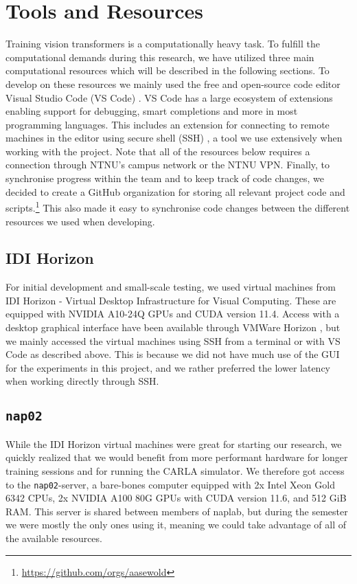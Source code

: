 \section{Tools and Resources}

Training vision transformers is a computationally heavy task.
To fulfill the computational demands during this research,
we have utilized three main computational resources which will be described in the following sections. To develop on these resources we mainly used the free and open-source code editor Visual Studio Code (VS Code) \cite{vs-code}. VS Code has a large ecosystem of extensions enabling support for debugging, smart completions and more in most programming languages. This includes an extension for connecting to remote machines in the editor using secure shell (SSH) \cite{vs-code-ssh}, a tool we use extensively when working with the project. Note that all of the resources below requires a connection through NTNU's campus network or the NTNU VPN. Finally, to synchronise progress within the team and to keep track of code changes, we decided to create a GitHub organization for storing all relevant project code and scripts.\footnote{\url{https://github.com/orgs/aasewold}} This also made it easy to synchronise code changes between the different resources we used when developing.


\subsection{IDI Horizon}
For initial development and small-scale testing,
we used virtual machines from
IDI Horizon - Virtual Desktop Infrastructure for Visual Computing.
These are equipped with NVIDIA A10-24Q GPUs and CUDA version 11.4.
Access with a desktop graphical interface have been available through VMWare Horizon \cite{software:vmware:horizon}, but we mainly accessed the virtual machines using SSH from a terminal or with VS Code as described above. This is because we did not have much use of the GUI for the experiments in this project, and we rather preferred the lower latency when working directly through SSH.


\subsection{\texttt{nap02}}
While the IDI Horizon virtual machines were great for starting our research, we quickly realized that we would benefit from more performant hardware for longer training sessions and for running the CARLA simulator. We therefore got access to the \texttt{nap02}-server,
a bare-bones computer equipped with
2x Intel Xeon Gold 6342 CPUs,
2x NVIDIA A100 80G GPUs with CUDA version 11.6,
and 512 GiB RAM. This server is shared between members of \acrshort{naplab}, but during the semester we were mostly the only ones using it, meaning we could take advantage of all of the available resources.


